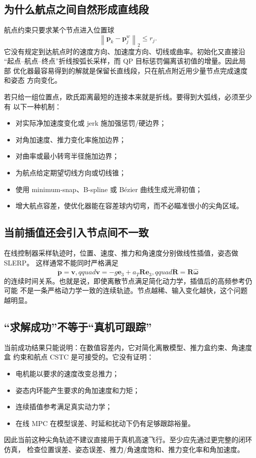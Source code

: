 \documentclass[UTF8,a4paper,11pt]{ctexart}
\newcommand{\normtwo}[1]{\left\lVert#1\right\rVert_2}
\begin{document}
\subsection{为什么航点之间自然形成直线段}

航点约束只要求某个节点进入位置球
\begin{equation}
 \normtwo{\bm p_k-\bm p_j^w}\leq r_j.
\end{equation}
它没有规定到达航点时的速度方向、加速度方向、切线或曲率。初始化又直接沿
“起点--航点--终点”折线按弧长采样，而 QP 目标惩罚偏离该初值的增量。因此局部
优化器最容易得到的解就是保留长直线段，只在航点附近用少量节点完成速度和姿态
方向变化。

若只给一组位置点，欧氏距离最短的连接本来就是折线。要得到大弧线，必须至少有
以下一种机制：
\begin{itemize}
  \item 对实际净加速度变化或 jerk 施加强惩罚/硬边界；
  \item 对角加速度、推力变化率施加边界；
  \item 对曲率或最小转弯半径施加边界；
  \item 为航点给定期望切线方向或切线锥；
  \item 使用 minimum-snap、B-spline 或 Bézier 曲线生成光滑初值；
  \item 增大航点容差，使优化器能在容差球内切弯，而不必瞄准很小的尖角区域。
\end{itemize}

\subsection{当前插值还会引入节点间不一致}

在线控制器采样轨迹时，位置、速度、推力和角速度分别做线性插值，姿态做 SLERP。
这样通常不能同时严格满足
\begin{equation}
 \dot{\bm p}=\bm v,qquad
 \dot{\bm v}=-g\bm e_3+a_T\bm R\bm e_3,qquad
 \dot{\bm R}=\bm R\widehat{\bm\omega}
\end{equation}
的连续时间关系。也就是说，即使离散节点满足简化动力学，插值后的高频参考仍可能
不是一条严格动力学一致的连续轨迹。节点越稀、输入变化越快，这个问题越明显。

\subsection{“求解成功”不等于“真机可跟踪”}

当前成功结果只能说明：在数值容差内，它对简化离散模型、推力盒约束、角速度盒
约束和航点 CSTC 是可接受的。它没有证明：
\begin{itemize}
  \item 电机能以要求的速度改变总推力；
  \item 姿态内环能产生要求的角加速度和力矩；
  \item 连续插值参考满足真实动力学；
  \item 在线 MPC 在模型误差、时延和扰动下仍有足够跟踪裕量。
\end{itemize}
因此当前这种尖角轨迹不建议直接用于真机高速飞行。至少应先通过更完整的闭环仿真，
检查位置误差、姿态误差、推力/角速度饱和、推力变化率和角加速度。
\end{document}
